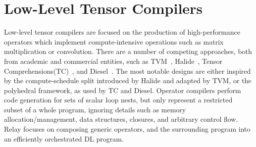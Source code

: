 \section{Low-Level Tensor Compilers}
Low-level tensor compilers are focused on the production
    of high-performance operators which implement compute-intensive
    operations such as matrix multiplication or convolution.
There are a number of competing approaches,
    both from academic and commercial entities, such as
    TVM~\citep{tvm_osdi18}, Halide~\citep{halide}, Tensor Comprehensions(TC)~\citep{tensor_comprehensions},
    and Diesel~\citep{diesel}.
The most notable designs are either inspired by the
    compute-schedule split introduced by Halide
    and adapted by TVM, or the polyhedral framework,
    as used by TC and Diesel.
Operator compilers perform code generation for sets of scalar loop nests,
    but only represent a restricted subset of a whole program, ignoring details such as
    memory allocation/management, data structures, closures, and arbitrary control flow.
Relay focuses on composing generic operators, and the surrounding program
    into an efficiently orchestrated DL program.





